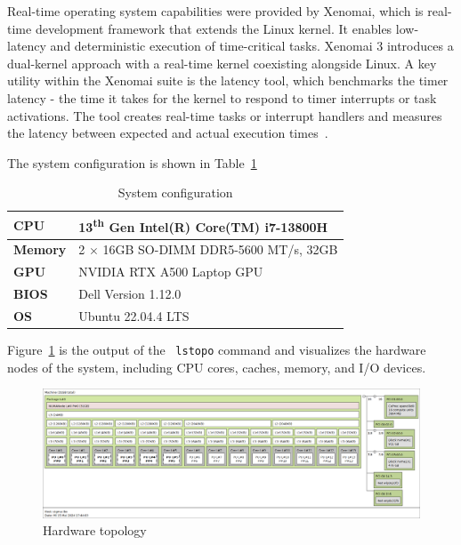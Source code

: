\documentclass[MMR,Master,english]{twbook}
\begin{document}
\bigskip \noindent Real-time operating system capabilities were provided by Xenomai, which is real-time development framework that extends the Linux kernel. It enables low-latency and deterministic execution of time-critical tasks. Xenomai 3 introduces a dual-kernel approach with a real-time kernel coexisting alongside Linux. A key utility within the Xenomai suite is the latency tool, which benchmarks the timer latency - the time it takes for the kernel to respond to timer interrupts or task activations. The tool creates real-time tasks or interrupt handlers and measures the latency between expected and actual execution times~\cite{XenomaiXenomai}.

\clearpage 

The system configuration is shown in Table~\ref{tab:testbed_configuration}


\begin{table}[h]
	\centering
	\caption[System configuration]{System configuration}
	\label{tab:testbed_configuration}
	\setlength{\tabcolsep}{0.5em} %
	{\renewcommand{\arraystretch}{1.2}%
	\begin{tabular}{|l|l|}
	\hline
	\textbf{CPU} & 13\textsuperscript{th} Gen Intel(R) Core(TM) i7-13800H \\ \hline
	\textbf{Memory} & 2 $\times$ 16GB SO-DIMM DDR5-5600 MT/s, 32GB \\ \hline
	\textbf{GPU} & NVIDIA RTX A500 Laptop GPU \\ \hline
	\textbf{BIOS} & Dell Version 1.12.0 \\ \hline
	\textbf{OS} & Ubuntu 22.04.4 LTS \\
	\hline
	\end{tabular}}
	\end{table}

\noindent Figure~\ref{fig:lstopo} is the output of the ~\texttt{lstopo} command and visualizes the hardware nodes of the system, including CPU cores, caches, memory, and I/O devices. 
\begin{figure}[H]
	\centering
	\includegraphics[width=1.0\columnwidth]{img/lstopo.png}
	\caption[Hardware topology]{Hardware topology}
	\label{fig:lstopo}
\end{figure}
\end{document}
